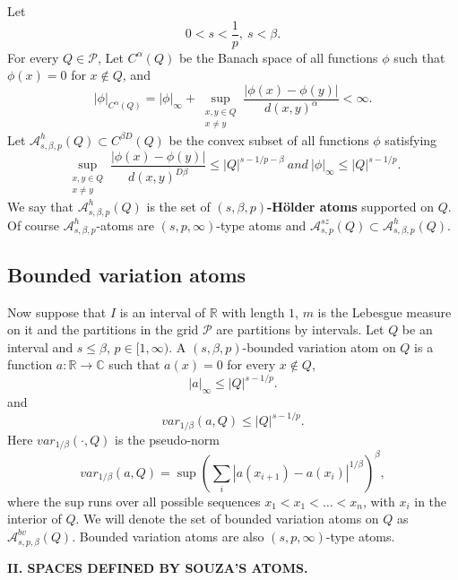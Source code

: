 \documentclass{amsart}
\theoremstyle{definition}
\begin{document}
Let 
$$0< s <  \frac{1}{p}, \ s < \beta.$$   For every $Q\in \mathcal{P}$, Let  $C^\alpha(Q)$ be the Banach space of all functions  $\phi$ such that $\phi(x)=0$ for $x \not\in Q$, and   
$$|\phi|_{C^\alpha(Q)}= |\phi|_\infty + \sup_{\substack{x,y \in Q\\ x\neq y}} \frac{|\phi(x)-\phi(y)|}{d(x,y)^\alpha} < \infty.$$
Let $\mathcal{A}^{h}_{s,\beta,p}(Q) \subset C^{\beta D}(Q)$ be the convex subset of all functions $\phi$ satisfying 
$$\sup_{\substack{x,y \in Q\\ x\neq y}} \frac{|\phi(x)-\phi(y)|}{d(x,y)^{D \beta}} \leq  |Q|^{s-1/p-\beta} \   and \ |\phi|_{\infty} \leq |Q|^{s-1/p}.$$
We say that $\mathcal{A}^{h}_{s,\beta,p}(Q)$ is the   set of {\bf $(s,\beta,p)$-H\"older atoms } supported on $Q$. Of course $\mathcal{A}^{h}_{s,\beta,p}$-atoms are  $(s,p,\infty)$-type atoms and $\mathcal{A}^{sz}_{s,p}(Q)\subset \mathcal{A}^{h}_{s,\beta,p}(Q)$.


\subsection{Bounded variation atoms}  Now suppose that  $I$ is an interval of $\mathbb{R}$ with  length $1$, $m$ is the Lebesgue measure on it and the partitions in the  grid $\mathcal{P}$ are partitions by intervals.  
Let $Q$ be an interval and $s \leq   \beta$, $p\in [1,\infty)$.  A $(s,\beta,p)$-bounded variation  atom on $Q$ is a function $a\colon \mathbb{R} \rightarrow \mathbb{C}$ such that $a(x)=0$ for every $x \not\in Q$,
$$|a|_\infty\leq |Q|^{s-1/p}.$$ 
and
$$var_{1/\beta}(a,Q) \leq |Q|^{s-1/p}.$$ 
Here $var_{1/\beta}(\cdot,Q)$ is the pseudo-norm 
$$var_{1/\beta}(a,Q) = \sup (\sum_i |a(x_{i+1})-a(x_i)|^{1/\beta})^{\beta},$$
where the sup runs over all possible sequences $x_1 < x_1 < \dots < x_n$, with $x_i$ in the  interior of $Q$.
We will denote the set of  bounded variation  atoms on  $Q$ as $\mathcal{A}^{bv}_{s, p,\beta}(Q)$. Bounded variation atoms are also $(s,p,\infty)$-type atoms.
\vspace{1cm}



\newpage

\centerline{ \bf II. SPACES DEFINED BY  SOUZA'S ATOMS.}
\vspace{1cm}

\fcolorbox{black}{white}{
\begin{minipage}{\textwidth}
\noindent   In Part II. we  suppose that $s> 0$, $p\in [1,\infty)$ and $q\in [1,\infty]$. \end{minipage} 
}
\ \\ \\
\end{document}
